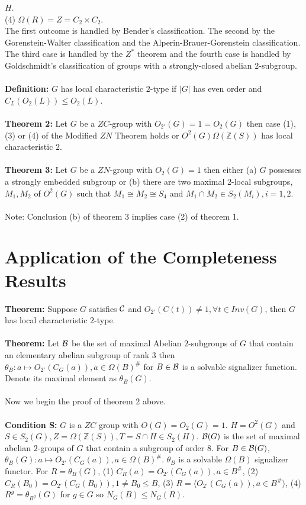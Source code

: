 $H$.\\
(4) $\Omega(R)=Z= C_2 \times C_2$.
\\
The first outcome is handled by Bender's classification.  The second by the Gorenstein-Walter
classification and the Alperin-Brauer-Gorenstein classification.  The third case is handled by the $Z^*$
theorem and the fourth case is handled by Goldschmidt's classification of groups with a strongly-closed
abelian $2$-subgroup.
\\
\\
{\bf Definition:}  $G$ has local characteristic $2$-type if $|G|$ has even order and
$C_L(O_2(L)) \leq O_2(L)$.
\\
\\
{\bf Theorem 2:}  Let $G$ be a $ZC$-group with $O_{2'}(G)=1=O_2(G)$ then case (1), (3) or (4)
of the Modified $ZN$ Theorem holds or $O^2(G) \Omega({\mathbb Z}(S))$ has local characteristic $2$.
\\
\\
{\bf Theorem 3:} Let $G$ be a $ZN$-group with $O_2(G)= 1$ then either (a)
$G$ possesses a strongly embedded subgroup or (b) there are two maximal $2$-local subgroups,
$M_1, M_2$ of $O^2(G)$ such that $M_1 \cong M_2 \cong S_4$ and $M_1 \cap M_2 \in S_2(M_i), i = 1,2$.
\\
\\
Note: Conclusion (b) of theorem 3 implies case (2) of theorem 1.
\section{Application of the Completeness Results}
{\bf Theorem:}  Suppose $G$ satisfies ${\cal C}$ and $O_{2'}(C(t)) \ne 1, \forall t \in Inv(G)$,
then $G$ has local characteristic $2$-type.
\\
\\
{\bf Theorem:} Let ${\cal B}$ be the set of maximal Abelian $2$-subgroups of $G$ that contain
an elementary abelian subgroup of rank $3$ then
$\theta_B: a \mapsto O_{2'}(C_G(a)), a \in \Omega(B)^{\#}$ for $B \in {\cal B}$ is a solvable
signalizer function.  Denote its maximal element as $\theta_B(G)$.
\\
\\
Now we begin the proof of theorem 2 above.
\\
\\
{\bf Condition {\cal S}:}  $G$ is a $ZC$ group with $O(G)= O_2(G)=1$.
$H=O^2(G)$ and
$S \in S_2(G), Z= \Omega({\mathbb Z}(S)), T= S \cap H \in S_2(H)$. ${\cal B}(G)$ is the set
of maximal abelian $2$-groups of $G$ that contain a subgroup of order $8$.   For $B \in {\cal B}(G)$,
$\theta_B(G): a \mapsto O_{2'}(C_G(a)), a \in \Omega(B)^\#$.  $\theta_B$ is a solvable $\Omega(B)$
signalizer functor.  For $R = \theta_B(G)$, (1) $C_R(a) = O_{2'}(C_G(a)), a \in B^\#$,
(2) $C_R(B_0) = O_{2'}(C_G(B_0)), 1 \neq B_0 \leq B$, (3) $R= \langle O_{2'}(C_G(a)), a \in B^\# \rangle$,
(4) $R^g = \theta_{B^g}(G)$ for $g \in G$ so $N_G(B) \leq N_G(R)$.
\\
\\

